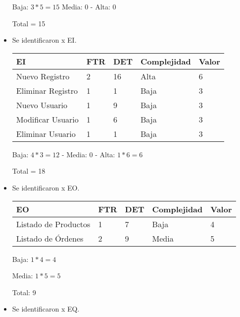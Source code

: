\begin{itemize}
    Baja: $3 * 5 = 15$
    Media: 0 -
    Alta: 0
    
    Total = 15

    \item Se identificaron x EI.
    
    \begin{table}[H]
        \centering
        \begin{tabular}{|l|l|l|l|l|}
            \hline
            EI                 & FTR & DET & Complejidad & Valor \\ \hline
            Nuevo Registro     & 2   & 16  & Alta        & 6     \\ \hline
            Eliminar Registro  & 1   & 1   & Baja        & 3     \\ \hline
            Nuevo Usuario      & 1   & 9   & Baja        & 3     \\ \hline
            Modificar Usuario  & 1   & 6   & Baja        & 3     \\ \hline
            Eliminar Usuario   & 1   & 1   & Baja        & 3     \\ \hline
        \end{tabular}
    \end{table}
    
    Baja: $4 * 3 = 12$ -
    Media: 0 -
    Alta: $1 * 6 = 6$

    Total = 18

    \item Se identificaron x EO.
    
    \begin{table}[H]
        \centering
        \begin{tabular}{|l|l|l|l|l|}
            \hline
            EO                   & FTR & DET & Complejidad & Valor \\ \hline
            Listado de Productos & 1   & 7   & Baja        & 4     \\ \hline
            Listado de Órdenes   & 2   & 9   & Media       & 5     \\
            \hline
        \end{tabular}
    \end{table}
    
    Baja: $1 * 4 = 4$
    
    Media: $1 * 5 = 5$
    
    Total: 9
    
    \item Se identificaron x EQ.


\end{itemize}
